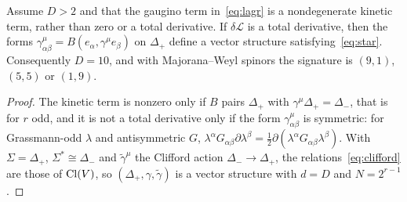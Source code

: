 \begin{proposition}
\label{prop:standard}
Assume $D>2$ and that the gaugino term in~\eqref{eq:lagr} is a nondegenerate kinetic term, rather than zero or a total derivative. If $\delta\mathcal L$ is a total derivative, then the forms $\gamma^\mu_{\alpha\beta}=B(e_\alpha,\gamma^\mu e_\beta)$ on $\Delta_+$ define a vector structure satisfying~\eqref{eq:star}. Consequently $D=10$, and with Majorana--Weyl spinors the signature is $(9,1)$, $(5,5)$ or $(1,9)$.
\end{proposition}

\begin{proof}
The kinetic term is nonzero only if $B$ pairs $\Delta_+$ with $\gamma^\mu\Delta_+=\Delta_-$, that is for $r$ odd, and it is not a total derivative only if the form $\gamma^\mu_{\alpha\beta}$ is symmetric: for Grassmann-odd $\lambda$ and antisymmetric $G$, $\lambda^\alpha G_{\alpha\beta}\partial\lambda^\beta=\frac12\partial(\lambda^\alpha G_{\alpha\beta}\lambda^\beta)$. With $\Sigma=\Delta_+$, $\Sigma^*\cong\Delta_-$ and $\tilde\gamma^\mu$ the Clifford action $\Delta_-\to\Delta_+$, the relations~\eqref{eq:clifford} are those of $\operatorname{Cl}(V)$, so $(\Delta_+,\gamma,\tilde\gamma)$ is a vector structure with $d=D$ and $N=2^{r-1}$.


\end{proof}
